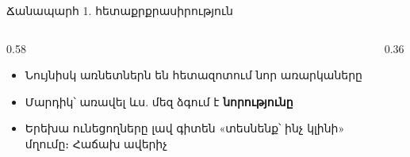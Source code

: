 \begin{frame}{Ճանապարհ 1. հետաքրքրասիրություն}
  \begin{columns}[c]
    \begin{column}{0.58\textwidth}
      \begin{itemize}
        \item Նույնիսկ առնետներն են հետազոտում նոր առարկաները
        \item<2-> Մարդիկ՝ առավել ևս. մեզ ձգում է \textbf{նորությունը}
        \item<3-> Երեխա ունեցողները լավ գիտեն «տեսնենք՝ ինչ կլինի» մղումը։ Հաճախ ավերիչ
      \end{itemize}
      \vspace{2mm}
    \end{column}
    \begin{column}{0.36\textwidth}
      \centering
      \ \par\medskip
    \end{column}
  \end{columns}
\end{frame}


